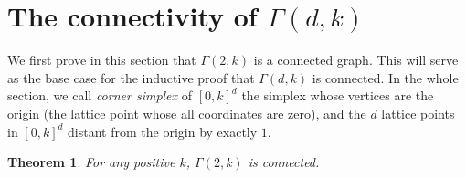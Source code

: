 \documentclass[a4paper]{article}
\newtheorem{theorem}{Theorem}
\begin{document}
\section{The connectivity of $\Gamma(d,k)$}\label{sec.conect}

We first prove in this section that $\Gamma(2,k)$ is a connected graph. This will serve as the base case for the inductive proof that $\Gamma(d,k)$ is connected. In the whole section, we call \emph{corner simplex} of $[0,k]^d$ the simplex whose vertices are the origin (the lattice point whose all coordinates are zero), and the $d$ lattice points in $[0,k]^d$ distant from the origin by exactly $1$.

\begin{theorem}\label{thm.Connec2}
For any positive $k$, $\Gamma(2,k)$ is connected.
\end{theorem}
\end{document}
